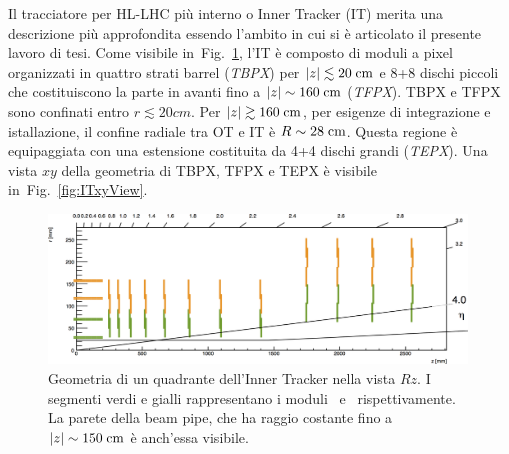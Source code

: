 Il tracciatore per HL-LHC pi\`u interno o Inner Tracker (IT) merita una descrizione pi\`u approfondita essendo l'ambito in cui si \`e articolato il presente lavoro di tesi. Come visibile in~Fig.~\ref{fig:ITRzView}, l'IT \`e composto di moduli a pixel organizzati in quattro strati barrel ({\em TBPX}) per $|z|\lesssim20\rm \; cm$ e 8+8 dischi piccoli che costituiscono la parte in avanti fino a $|z|\sim160\rm \; cm$ ({\em TFPX}). TBPX e TFPX sono confinati entro $r\lesssim20cm$. Per $|z|\gtrsim160\rm \; cm$, per esigenze di integrazione e istallazione, il confine radiale tra OT e IT \`e $R\sim28\rm \; cm$. Questa regione \`e equipaggiata con una estensione costituita da 4+4 dischi grandi ({\em TEPX}). Una vista $xy$ della geometria di TBPX, TFPX e TEPX \`e visibile in~Fig.~\ref{fig:ITxyView}. 
\begin{figure}
\centering
\includegraphics[width=0.99\textwidth]{Immagini/ITRzLayout.png}
\caption{Geometria di un quadrante dell'Inner Tracker nella vista $Rz$. I segmenti verdi e gialli rappresentano i moduli \modud\ e \moddd\, rispettivamente. La parete della beam pipe, che ha raggio costante fino a $|z|\sim 150\rm \; cm$ \`e anch'essa visibile.}
\label{fig:ITRzView}
\end{figure}
%
